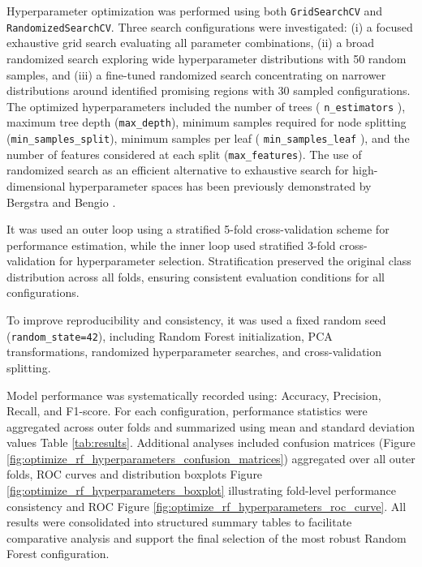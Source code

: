 Hyperparameter optimization was performed using both \texttt{GridSearchCV} and \texttt{RandomizedSearchCV}. Three search
configurations were investigated: (i) a focused exhaustive grid search evaluating all parameter combinations, (ii) a broad randomized search exploring
wide hyperparameter distributions with 50 random samples, and (iii) a fine-tuned randomized search concentrating on narrower distributions around identified promising regions
with 30 sampled configurations. The optimized hyperparameters included the number of trees ( \texttt{n\_estimators} ), maximum tree depth (\texttt{max\_depth}), minimum samples required for
node splitting (\texttt{min\_samples\_split}), minimum samples per leaf ( \texttt{min\_samples\_leaf} ), and the number of features considered at each split (\texttt{max\_features}). The use
of randomized search as an efficient alternative to exhaustive search for high-dimensional hyperparameter spaces has been previously demonstrated by Bergstra and Bengio \cite{bergstra2012random}.

It was used an outer loop using a stratified 5-fold cross-validation scheme for performance estimation,
while the inner loop used stratified 3-fold cross-validation for hyperparameter selection. Stratification preserved the original class distribution across all folds, ensuring consistent
evaluation conditions for all configurations.

To improve reproducibility and consistency, it was used a fixed random seed (\texttt{random\_state=42}), including Random Forest initialization, PCA transformations,
randomized hyperparameter searches, and cross-validation splitting.

Model performance was systematically recorded using: Accuracy, Precision, Recall, and F1-score. For each configuration, performance statistics were
aggregated across outer folds and summarized using mean and standard deviation values Table \ref{tab:results}. Additional analyses included confusion matrices (Figure \ref{fig:optimize_rf_hyperparameters_confusion_matrices}) aggregated over all outer folds, ROC curves
and distribution boxplots Figure \ref{fig:optimize_rf_hyperparameters_boxplot} illustrating fold-level performance consistency and ROC Figure \ref{fig:optimize_rf_hyperparameters_roc_curve}. All results
were consolidated into structured summary tables to facilitate comparative analysis and support the final selection of the most robust Random Forest configuration.

